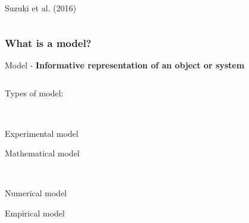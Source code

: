 \documentclass{beamer}
\begin{document}
\begin{frame}
\begin{columns}[t]
\begin{column}{0.5\paperwidth}
\begin{minipage}[t][.6\textheight][t]{\linewidth}
        \vspace{-0.2cm}
      
        \centering \tiny Suzuki et al. (2016)
        
      \end{minipage}
      
    \end{column}

  \end{columns}

  
\end{frame}

\begin{frame}
  \frametitle{What is a model?}

  \vspace{-0.45cm}
  
  Model - \textbf{Informative representation of an object or system} \\

  \begin{columns}[t]

    \begin{column}{0.5\paperwidth}

      \begin{minipage}[t][.6\textheight][t]{\linewidth}

            Types of model:
            
            \begin{itemize}
            \item {\color{gray}{Conceptual model}\\
            \item Experimental model}
            \item Mathematical model \\
              \begin{itemize}
              \item {\color{gray}{Analytical model} \\
              \item Numerical model}
              \item Empirical model
              \end{itemize}
            \end{itemize}

      \end{minipage}
      
    \end{column}


\end{columns}
\end{frame}
\end{document}
